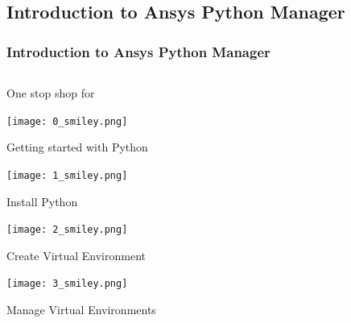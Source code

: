\documentclass[t]{beamer}
\begin{document}
	\subsection{Introduction to Ansys Python Manager}
	\begin{frame}
		\frametitle{Introduction to Ansys Python Manager}
		\vspace{-9pt}
		\begin{center}
			\begin{columns}[T]
				\begin{column}{.5\textwidth}
					\vspace{20pt} %
					\small
					One stop shop for
					\begin{noitemize}
						\item
						\begin{minipage}{0.1\textwidth}
							\texttt{[image: 0\_smiley.png]}
						\end{minipage}
						\hspace{-0.06\textwidth}
						\begin{minipage}{0.8\textwidth}
							Getting started with Python
						\end{minipage}
						\item
						\begin{minipage}{0.1\textwidth}
							\texttt{[image: 1\_smiley.png]}
						\end{minipage}
						\hspace{-0.06\textwidth}
						\begin{minipage}{0.8\textwidth}
							Install Python
						\end{minipage}
						\item
						\begin{minipage}{0.1\textwidth}
							\texttt{[image: 2\_smiley.png]}
						\end{minipage}
						\hspace{-0.06\textwidth}
						\begin{minipage}{0.8\textwidth}
							Create Virtual Environment
						\end{minipage}
						\item
						\begin{minipage}{0.1\textwidth}
							\texttt{[image: 3\_smiley.png]}
						\end{minipage}
						\hspace{-0.06\textwidth}
						\begin{minipage}{0.8\textwidth}
							Manage Virtual Environments
						\end{minipage}

\end{noitemize}
\end{column}
\end{columns}
\end{center}
\end{frame}
\end{document}
